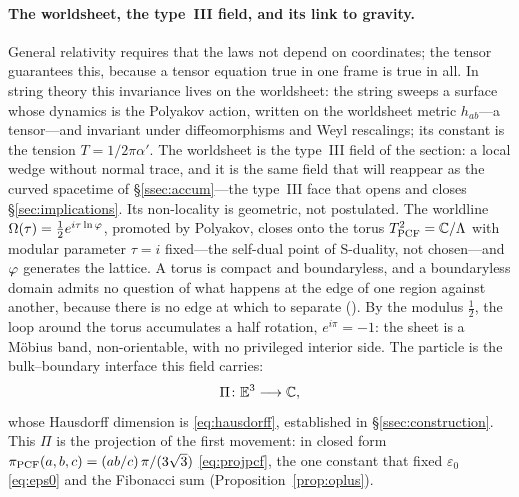 \paragraph{The worldsheet, the type~III field, and its link to gravity.}
General relativity requires that the laws not depend on coordinates; the tensor guarantees
this, because a tensor equation true in one frame is true in all. In string theory this
invariance lives on the worldsheet: the string sweeps a surface whose dynamics is the
Polyakov action, written on the worldsheet metric $h_{ab}$---a tensor---and invariant under
diffeomorphisms and Weyl rescalings; its constant is the tension $T=1/2\pi\alpha'$. The
worldsheet is the type~III field of the section: a local wedge without normal trace, and it
is the same field that will reappear as the curved spacetime of \S\ref{ssec:accum}---the
type~III face that opens and closes \S\ref{sec:implications}. Its non-locality is geometric,
not postulated. The worldline $\Omega(\tau)=\tfrac12 e^{i\tau\ln\varphi}$, promoted by Polyakov,
closes onto the torus $T^2_{\mathrm{PCF}}=\mathbb{C}/\Lambda$ with modular parameter $\tau=i$
fixed---the self-dual point of S-duality, not chosen---and $\varphi$ generates the lattice.
A torus is compact and boundaryless, and a boundaryless domain admits no question of what
happens at the edge of one region against another, because there is no edge at which to
separate (). By the modulus $\tfrac12$, the loop
around the torus accumulates a half rotation, $e^{i\pi}=-1$: the sheet is a M\"obius band,
non-orientable, with no privileged interior side. The particle is the bulk--boundary
interface this field carries:
\begin{equation}\label{eq:obs-interface}
  \Pi\colon\mathbb{E}^{3}\longrightarrow\mathbb{C} ,
\end{equation}
whose Hausdorff dimension is \eqref{eq:hausdorff}, established in \S\ref{ssec:construction}.
This $\Pi$ is the projection of the first movement: in closed form
$\pi_{\mathrm{PCF}}(a,b,c)=(ab/c)\,\pi/(3\sqrt3)$ \eqref{eq:projpcf}, the one constant that fixed
$\varepsilon_0$ \eqref{eq:eps0} and the Fibonacci sum (Proposition~\ref{prop:oplus}).

%

